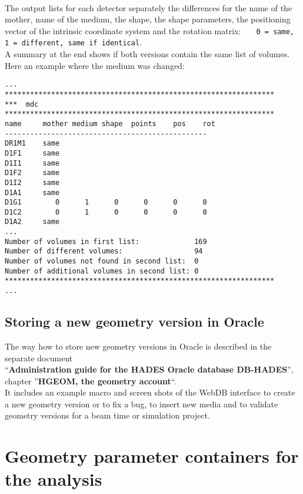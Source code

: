 ~\\[0.5pt]
The output lists for each detector separately the differences for the name of the mother, name of the medium, the shape, 
the shape parameters, the positioning vector of the intrinsic coordinate system and the rotation matrix:
\verb+   0 = same, 1 = different, same if identical+.\\
A summary at the end shows if both versions contain the same list of volumes.\\

Here an example where the medium was changed:
\begin{lstlisting}
...
****************************************************************
***  mdc
****************************************************************
name     mother medium shape  points    pos    rot
------------------------------------------------
DR1M1    same
D1F1     same
D1I1     same
D1F2     same
D1I2     same
D1A1     same
D1G1        0      1      0      0      0      0  
D1C2        0      1      0      0      0      0  
D1A2     same
...
Number of volumes in first list:             169
Number of different volumes:                 94
Number of volumes not found in second list:  0
Number of additional volumes in second list: 0
****************************************************************
...
\end{lstlisting}

\subsection[Storing a new geometry version in Oracle]{Storing a new geometry version in Oracle}

The way how to store new geometry versions in Oracle is described in the separate document \\
``\textbf{Administration guide for the HADES Oracle database DB-HADES}'', chapter 
''\textbf{HGEOM, the geometry account}``.\\
It includes an example macro and screen shots of the WebDB interface to create a new geometry version or to fix a bug,
to insert new media and to validate geometry versions for a beam time or simulation project.


\section[Geometry parameter containers for the analysis]{Geometry parameter containers for the analysis} 
\label{sec:geomParameterContainers}

